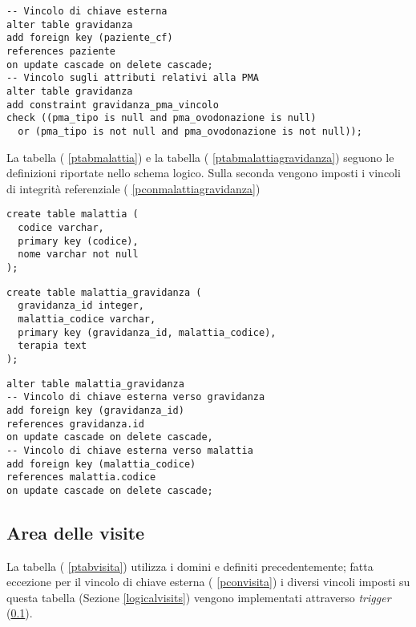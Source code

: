 \begin{lstlisting}[float,caption={Definizione di vincoli aggiuntivi nella tabella \tab{gravidanza}.},label=pcongravidanza]
-- Vincolo di chiave esterna
alter table gravidanza
add foreign key (paziente_cf)
references paziente
on update cascade on delete cascade;
-- Vincolo sugli attributi relativi alla PMA
alter table gravidanza
add constraint gravidanza_pma_vincolo
check ((pma_tipo is null and pma_ovodonazione is null)
  or (pma_tipo is not null and pma_ovodonazione is not null));
\end{lstlisting}

La tabella  (\lstlistingname{} \ref{ptabmalattia}) e la tabella  (\lstlistingname{} \ref{ptabmalattiagravidanza}) seguono le definizioni riportate nello schema logico.
Sulla seconda vengono imposti i vincoli di integrità referenziale (\lstlistingname{} \ref{pconmalattiagravidanza})

\begin{lstlisting}[float,caption={Definizione della tabella \tab{malattia}.},label=ptabmalattia]
create table malattia (
  codice varchar,
  primary key (codice),
  nome varchar not null
);
\end{lstlisting}

\begin{lstlisting}[float,caption={Definizione della tabella \tab{malattia\_gravidanza}.},label=ptabmalattiagravidanza]
create table malattia_gravidanza (
  gravidanza_id integer,
  malattia_codice varchar,
  primary key (gravidanza_id, malattia_codice),
  terapia text
);
\end{lstlisting}

\begin{lstlisting}[float,caption={Definizione dei vincoli di chiave esterna nella tabella \tab{malattia\_gravidanza}.},label=pconmalattiagravidanza]
alter table malattia_gravidanza
-- Vincolo di chiave esterna verso gravidanza
add foreign key (gravidanza_id)
references gravidanza.id
on update cascade on delete cascade,
-- Vincolo di chiave esterna verso malattia
add foreign key (malattia_codice)
references malattia.codice
on update cascade on delete cascade;
\end{lstlisting}

\subsection{Area delle visite}

La tabella  (\lstlistingname{} \ref{ptabvisita}) utilizza i domini  e  definiti precedentemente; fatta eccezione per il vincolo di chiave esterna (\lstlistingname{} \ref{pconvisita}) i diversi vincoli imposti su questa tabella (Sezione \ref{logicalvisits}) vengono implementati attraverso \emph{trigger} (\ref{}).

